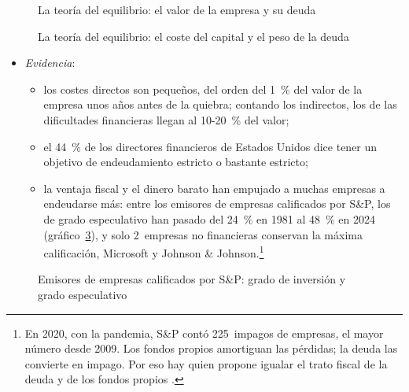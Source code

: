 \documentclass[11pt]{article}
\begin{document}
\begin{figure}[H]
\centering
\caption{La teoría del equilibrio: el valor de la empresa y su deuda}\label{fig:valor-tradeoff}
\end{figure}

\begin{figure}[H]
\centering
\caption{La teoría del equilibrio: el coste del capital y el peso de la deuda}\label{fig:coste-equilibrio}
\end{figure}

\begin{itemize}
\item \emph{Evidencia}:
  \begin{itemize}
  \item los costes directos son pequeños, del orden del 1~\% del valor de la empresa unos años antes de la quiebra\nocite{Warner1977Bankruptcy}; contando los indirectos, los de las dificultades financieras llegan al 10-20~\% del valor\nocite{AndradeKaplan1998How};
  \item el 44~\% de los directores financieros de Estados Unidos dice tener un objetivo de endeudamiento estricto o bastante estricto\nocite{GrahamHarvey2002How};
  \item la ventaja fiscal y el dinero barato han empujado a muchas empresas a endeudarse más\nocite{Wigglesworth2020Debt}: entre los emisores de empresas calificados por S\&P, los de grado especulativo han pasado del 24~\% en 1981 al 48~\% en 2024 (gráfico~\ref{fig:sp-calificaciones-grado}), y solo 2~empresas no financieras conservan la máxima calificación, Microsoft y Johnson \& Johnson\nocite{Thoelcke2026AAA}.\footnote{En 2020, con la pandemia, S\&P contó 225~impagos de empresas, el mayor número desde 2009\nocite{SP2025DefaultStudy}. Los fondos propios amortiguan las pérdidas; la deuda las convierte en impago\nocite{StewartGlassman1988Motives}. Por eso hay quien propone igualar el trato fiscal de la deuda y de los fondos propios .}
  \end{itemize}
\end{itemize}

\begin{figure}[H]
\centering
\caption{Emisores de empresas calificados por S\&P: grado de inversión y grado especulativo}\label{fig:sp-calificaciones-grado}
\end{figure}
\end{document}
